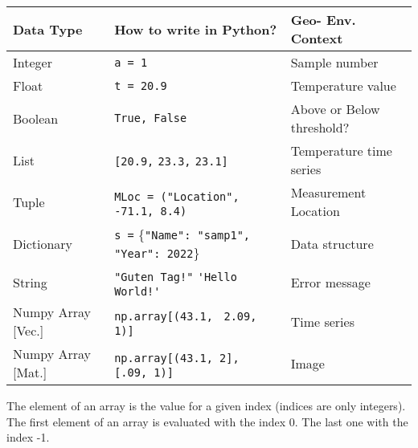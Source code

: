 \ifanswers
  \begin{tcolorbox}[enhanced jigsaw,breakable,pad at break*=1mm,
  colback=blue!5!white,colframe=babyblueeyes,title=Solutions,
  watermark color=white]
  \begin{center}
      \label{tab:table1}
        \begin{tabularx}{\linewidth}{ X | X | X }
        \textbf{Data Type} & \textbf{How to write in Python?} & \textbf{Geo- Env. Context}\\
        \hline
        Integer & \verb|a = 1| & Sample number \\
        Float & \verb|t = 20.9| & Temperature value \\
        Boolean & \verb|True, False| & Above or Below threshold? \\
        List & \verb|[20.9,| \verb|23.3,| \verb|23.1]| & Temperature time series \\
        Tuple & \verb|MLoc = ("Location",| \verb| -71.1, 8.4)| & Measurement Location \\
        Dictionary & \verb|s =| \{\verb|"Name": "samp1",| \verb|"Year": 2022|\}  & Data structure\\
        String & \verb|"Guten Tag!"| \verb|'Hello World!'| & Error message \\
        Numpy Array [Vec.] & \verb|np.array[(43.1,| \verb| 2.09, 1)]| & Time series \\
        Numpy Array [Mat.] & \verb|np.array[(43.1, 2],| \verb| [.09, 1)]| & Image \\
      \end{tabularx}
    \end{center}
  The element of an array is the value for a given index (indices are only integers). The first element of an array is evaluated with the index 0. The last one with the index -1. 
  \end{tcolorbox}
\fi


